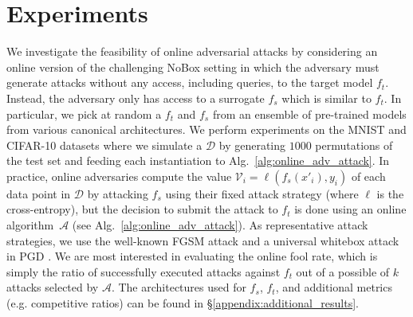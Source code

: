 \section{Experiments}
\label{section:experiments}
We investigate the feasibility of online adversarial attacks by considering an online version of the challenging NoBox setting \citep{bose2020adversarial} in which the adversary must generate attacks without any access, including queries, to the target model $f_t$. Instead, the adversary only has access to a surrogate $f_s$ which is similar to $f_t$. In particular, we pick at random a $f_t$ and $f_s$ from an ensemble of pre-trained models from various canonical architectures. We perform experiments on the MNIST \cite{lecun-mnisthandwrittendigit-2010} and CIFAR-10 \cite{krizhevsky2009learning} datasets where we simulate a $\mathcal{D}$ by generating $1000$ permutations of the test set and feeding each instantiation to Alg.~\ref{alg:online_adv_attack}. In practice, online adversaries compute the value 
$\mathcal{V}_i=\ell(f_s(x'_i),y_i)$ 
of each data point in $\mathcal{D}$ by attacking $f_s$ using their fixed attack strategy
(where $\ell$ is the cross-entropy),
but the decision to submit the attack to $f_t$ is done using an online algorithm~$\mathcal{A}$ (see Alg.~\ref{alg:online_adv_attack}). 
As representative attack strategies, we use the well-known FGSM attack \citep{goodfellow2014explaining} and a universal whitebox attack in PGD \citep{madry2017towards}. 
We are most interested in evaluating the online fool rate, which is simply the ratio of successfully executed attacks against $f_t$ out of a possible of $k$ attacks selected by $\mathcal{A}$.  The architectures used for $f_s$, $f_t$, and additional metrics (e.g. competitive ratios) can be found in \S\ref{appendix:additional_results}. 

